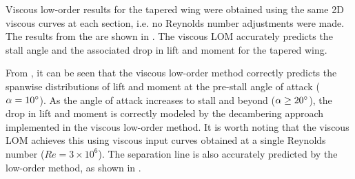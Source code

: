 Viscous low-order results for the tapered wing were obtained using the same 2D viscous curves at each section, i.e. no Reynolds number adjustments were made. The results from the \methodname are shown in .
The viscous LOM accurately predicts the stall angle and the associated drop in lift and moment for the tapered wing.

From , it can be seen that the viscous low-order method correctly predicts the spanwise distributions of lift and moment at the pre-stall angle of attack ($\alpha = 10^\circ{}$). %
As the angle of attack increases to stall and beyond ($ \alpha \geq 20^\circ{}$), the drop in lift and moment is correctly modeled by the decambering approach implemented in the viscous low-order method. It is worth noting that the viscous LOM achieves this using viscous input curves obtained at a single Reynolds number ($Re = 3\times10^6$). The separation line is also accurately predicted by the low-order method, as shown in .


